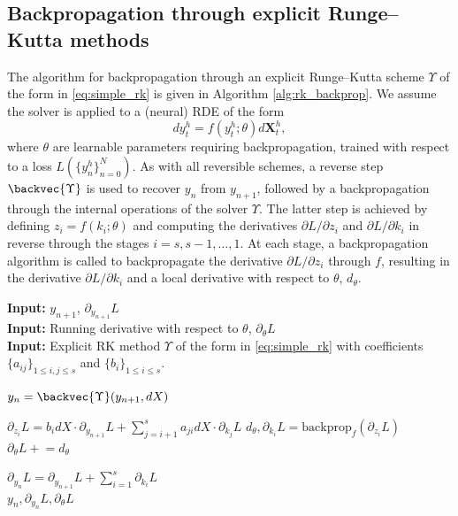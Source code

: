 \documentclass{article} %
\theoremstyle{definition}
\theoremstyle{remark}
\begin{document}
\subsection{Backpropagation through explicit Runge--Kutta methods}

The algorithm for backpropagation through an explicit Runge--Kutta scheme $\Upsilon$ of the form in \eqref{eq:simple_rk} is given in Algorithm \ref{alg:rk_backprop}. We assume the solver is applied to a (neural) RDE of the form
\begin{equation}
    dy^h_t = f(y^h_t; \theta) d\mathbf{X}^h_t,
\end{equation}
where $\theta$ are learnable parameters requiring backpropagation, trained with respect to a loss $L(\{y^h_n\}_{n=0}^N)$. As with all reversible schemes, a reverse step ${\backvec{\Upsilon}}$ is used to recover $y_n$ from $y_{n+1}$, followed by a backpropagation through the internal operations of the solver $\Upsilon$. The latter step is achieved by defining $z_i = f(k_i; \theta)$ and computing the derivatives $\partial L / \partial z_i$ and $\partial L / \partial k_i$ in reverse through the stages $i = s, s-1, \ldots, 1$. At each stage, a backpropagation algorithm is called to backpropagate the derivative $\partial L / \partial z_i$ through $f$, resulting in the derivative $\partial L / \partial k_i$ and a local derivative with respect to $\theta$, $d_\theta$.

\begin{algorithm}
\caption{Backpropagation through Explicit Runge--Kutta Schemes}\label{alg:rk_backprop}
\textbf{Input:} $y_{n+1}$, $\partial_{y_{n+1}} L$\\
\textbf{Input:} Running derivative with respect to $\theta$, $\partial_\theta L$\\
\textbf{Input:} Explicit RK method $\Upsilon$ of the form in \eqref{eq:simple_rk} with coefficients $\{a_{ij}\}_{1 \leq i,j \leq s}$ and $\{b_i\}_{1 \leq i \leq s}$.
\begin{algorithmic}

\State $y_n = \backvec{\Upsilon}(y_{n+1}, dX)$

    \State $\partial_{z_i} L = b_i dX \cdot \partial_{y_{n+1}}L + \sum_{j=i+1}^s a_{ji} dX \cdot \partial_{k_j}L$
    \State $d_\theta, \partial_{k_i} L = \text{backprop}_f( \partial_{z_i}L)$
    \State $\partial_\theta L \mathrel{+}= d_\theta$
\EndFor

\State $\partial_{y_n} L = \partial_{y_{n+1}} L + \sum_{i=1}^s \partial_{k_i} L$\\
\Return $y_n, \partial_{y_n} L, \partial_\theta L$

\end{algorithmic}
\end{algorithm}
\end{document}
